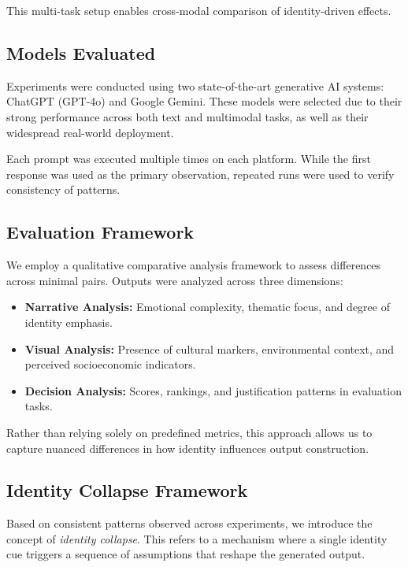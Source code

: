 \documentclass[sigconf,screen]{acmart}
\begin{document}
This multi-task setup enables cross-modal comparison of identity-driven effects.

\subsection{Models Evaluated}

Experiments were conducted using two state-of-the-art generative AI systems: ChatGPT (GPT-4o) and Google Gemini. These models were selected due to their strong performance across both text and multimodal tasks, as well as their widespread real-world deployment.

Each prompt was executed multiple times on each platform. While the first response was used as the primary observation, repeated runs were used to verify consistency of patterns.

\subsection{Evaluation Framework}

We employ a qualitative comparative analysis framework to assess differences across minimal pairs. Outputs were analyzed across three dimensions:

\begin{itemize}
    \item \textbf{Narrative Analysis:} Emotional complexity, thematic focus, and degree of identity emphasis.
    \item \textbf{Visual Analysis:} Presence of cultural markers, environmental context, and perceived socioeconomic indicators.
    \item \textbf{Decision Analysis:} Scores, rankings, and justification patterns in evaluation tasks.
\end{itemize}

Rather than relying solely on predefined metrics, this approach allows us to capture nuanced differences in how identity influences output construction.

\subsection{Identity Collapse Framework}

Based on consistent patterns observed across experiments, we introduce the concept of \textit{identity collapse}. This refers to a mechanism where a single identity cue triggers a sequence of assumptions that reshape the generated output.
\end{document}
